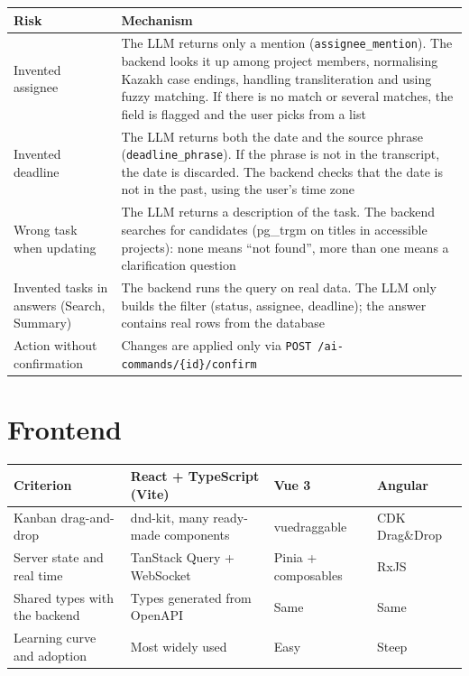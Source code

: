 \documentclass[11pt,a4paper]{article}
\newcommand{\tblstart}{\small\rowcolors{2}{gray!7}{white}}
\newcommand{\code}[1]{\texttt{#1}}
\begin{document}
{\tblstart
\begin{xltabular}{\textwidth}{P{4cm} L}
\toprule
\textbf{Risk} & \textbf{Mechanism} \\
\midrule
\endhead
Invented assignee & The LLM returns only a mention (\code{assignee\_mention}). The backend looks it up among project members, normalising Kazakh case endings, handling transliteration and using fuzzy matching. If there is no match or several matches, the field is flagged and the user picks from a list \\
Invented deadline & The LLM returns both the date and the source phrase (\code{deadline\_phrase}). If the phrase is not in the transcript, the date is discarded. The backend checks that the date is not in the past, using the user's time zone \\
Wrong task when updating & The LLM returns a description of the task. The backend searches for candidates (pg\_trgm on titles in accessible projects): none means ``not found'', more than one means a clarification question \\
Invented tasks in answers (Search, Summary) & The backend runs the query on real data. The LLM only builds the filter (status, assignee, deadline); the answer contains real rows from the database \\
Action without confirmation & Changes are applied only via \code{POST /ai-commands/\{id\}/confirm} \\
\bottomrule
\end{xltabular}}

\section{Frontend}

{\tblstart
\begin{xltabular}{\textwidth}{P{3.6cm} L L L}
\toprule
\textbf{Criterion} & \textbf{React + TypeScript (Vite)} & \textbf{Vue 3} & \textbf{Angular} \\
\midrule
\endhead
Kanban drag-and-drop & dnd-kit, many ready-made components & vuedraggable & CDK Drag\&Drop \\
Server state and real time & TanStack Query + WebSocket & Pinia + composables & RxJS \\
Shared types with the backend & Types generated from OpenAPI & Same & Same \\
Learning curve and adoption & Most widely used & Easy & Steep \\
\bottomrule
\end{xltabular}}
\end{document}
